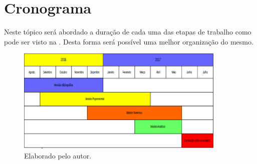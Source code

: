 \chapter{Cronograma}
Neste tópico será abordado a duração de cada uma das etapas de trabalho como pode ser visto na . Desta forma será possível uma melhor organização do mesmo.

\begin{figure}[H]
    \centering
    \includegraphics[width=10cm]{figuras/cronograma.png}
    \caption{Elaborado pelo autor.}
    \label{fig_cronograma}
\end{figure}